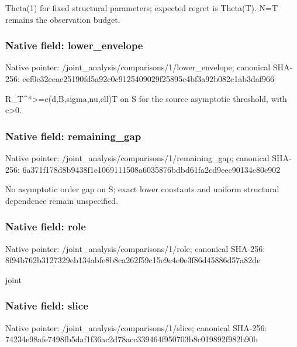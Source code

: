 \documentclass[10pt,a4paper]{article}
\begin{document}
\begingroup\raggedright\sloppy Theta(1) for fixed structural parameters;\allowbreak{} expected regret is Theta(T). N=\allowbreak{}T remains the observation budget.\par\endgroup

\subsubsection{Native field: lower\_\allowbreak{}envelope}
Native pointer: /joint\_\allowbreak{}analysis/comparisons/1/lower\_\allowbreak{}envelope; canonical SHA-256: eef0c32eeae25190fd5a92c0c9125409029f25895c4bf3a92b082c1ab3daf966

\begingroup\raggedright\sloppy R\_\allowbreak{}T\textasciicircum{}*>=\allowbreak{}c(d,\allowbreak{}B,\allowbreak{}sigma,\allowbreak{}nu,\allowbreak{}ell)T on S for the source asymptotic threshold,\allowbreak{} with c>0.\par\endgroup

\subsubsection{Native field: remaining\_\allowbreak{}gap}
Native pointer: /joint\_\allowbreak{}analysis/comparisons/1/remaining\_\allowbreak{}gap; canonical SHA-256: 6a371f178d8b9438f1e1069111508a6035876bdbd61fa2cd9eec90134c80e902

\begingroup\raggedright\sloppy No asymptotic order gap on S;\allowbreak{} exact lower constants and uniform structural dependence remain unspecified.\par\endgroup

\subsubsection{Native field: role}
Native pointer: /joint\_\allowbreak{}analysis/comparisons/1/role; canonical SHA-256: 8f94b762b3127329eb134abfe8b8ca262f59c15e9c4e0e3f86d45886d57a82de

\begingroup\raggedright\sloppy joint\par\endgroup

\subsubsection{Native field: slice}
Native pointer: /joint\_\allowbreak{}analysis/comparisons/1/slice; canonical SHA-256: 74234e98afe7498fb5daf1f36ac2d78acc339464f950703b8c019892f982b90b
\end{document}

